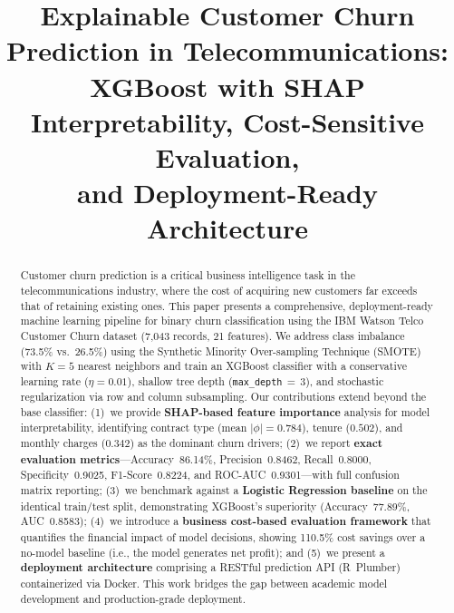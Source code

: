 \documentclass[10pt, conference, letterpaper]{IEEEtran}
\begin{document}
\title{Explainable Customer Churn Prediction in Telecommunications:\\XGBoost with SHAP Interpretability, Cost-Sensitive Evaluation,\\and Deployment-Ready Architecture}

\author{
}

\maketitle

\begin{abstract}
Customer churn prediction is a critical business intelligence task in the telecommunications industry, where the cost of acquiring new customers far exceeds that of retaining existing ones. This paper presents a comprehensive, deployment-ready machine learning pipeline for binary churn classification using the IBM Watson Telco Customer Churn dataset (7,043 records, 21 features). We address class imbalance (73.5\% vs.\ 26.5\%) using the Synthetic Minority Over-sampling Technique (SMOTE) with $K{=}5$ nearest neighbors and train an XGBoost classifier with a conservative learning rate ($\eta{=}0.01$), shallow tree depth (\texttt{max\_depth}$\,{=}\,$3), and stochastic regularization via row and column subsampling. Our contributions extend beyond the base classifier: (1)~we provide \textbf{SHAP-based feature importance} analysis for model interpretability, identifying contract type (mean $|\phi|{=}0.784$), tenure ($0.502$), and monthly charges ($0.342$) as the dominant churn drivers; (2)~we report \textbf{exact evaluation metrics}---Accuracy~86.14\%, Precision~0.8462, Recall~0.8000, Specificity~0.9025, F1-Score~0.8224, and ROC-AUC~0.9301---with full confusion matrix reporting; (3)~we benchmark against a \textbf{Logistic Regression baseline} on the identical train/test split, demonstrating XGBoost's superiority (Accuracy~77.89\%, AUC~0.8583); (4)~we introduce a \textbf{business cost-based evaluation framework} that quantifies the financial impact of model decisions, showing 110.5\% cost savings over a no-model baseline (i.e., the model generates net profit); and (5)~we present a \textbf{deployment architecture} comprising a RESTful prediction API (R~Plumber) containerized via Docker. This work bridges the gap between academic model development and production-grade deployment.
\end{abstract}
\end{document}
